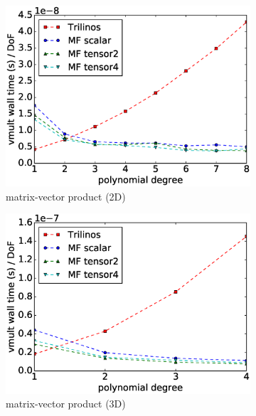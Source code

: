 \documentclass[times,doublespace]{nmeauth}
\begin{document}
\begin{figure}[!ht]
  \centering
  \begin{subfigure}[b]{0.49\textwidth}
      \centering
      \includegraphics[width=\textwidth]{IWR_timing2d.eps}
      \caption{matrix-vector product (2D)}
      \label{fig:benchmark_miehe_IWR_vmult2}
  \end{subfigure}
  \begin{subfigure}[b]{0.49\textwidth}
    \centering
    \includegraphics[width=\textwidth]{IWR_timing3d.eps}
    \caption{matrix-vector product (3D)}
    \label{fig:benchmark_miehe_IWR_vmult3}
  \end{subfigure}
  ~
  \begin{subfigure}[b]{0.49\textwidth}
      \centering

\end{subfigure}
\end{figure}
\end{document}
